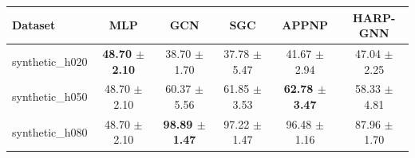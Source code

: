 \begin{tabular}{lccccc}
\toprule
Dataset & MLP & GCN & SGC & APPNP & HARP-GNN \\
\midrule
synthetic\_h020 & \textbf{48.70 $\pm$ 2.10} & 38.70 $\pm$ 1.70 & 37.78 $\pm$ 5.47 & 41.67 $\pm$ 2.94 & 47.04 $\pm$ 2.25 \\
synthetic\_h050 & 48.70 $\pm$ 2.10 & 60.37 $\pm$ 5.56 & 61.85 $\pm$ 3.53 & \textbf{62.78 $\pm$ 3.47} & 58.33 $\pm$ 4.81 \\
synthetic\_h080 & 48.70 $\pm$ 2.10 & \textbf{98.89 $\pm$ 1.47} & 97.22 $\pm$ 1.47 & 96.48 $\pm$ 1.16 & 87.96 $\pm$ 1.70 \\
\bottomrule
\end{tabular}
